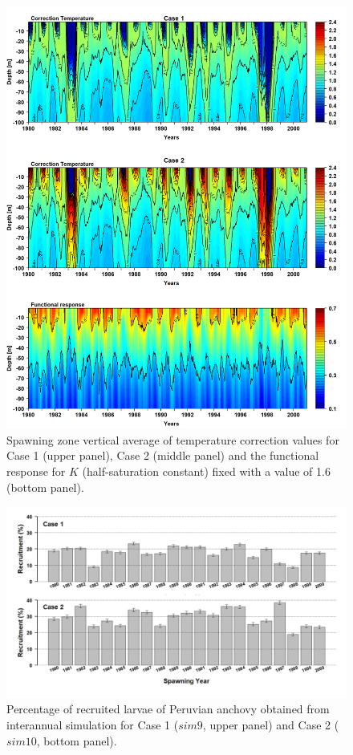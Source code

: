 \begin{figure}[H]
	\includegraphics[width=1.0\textwidth]{figures/Chap3CT_Depth_f_Inter.png}
	\centering
	\caption{Spawning zone vertical average of temperature correction values for Case 1 (upper panel), Case 2 (middle panel) and the functional response for $K$ (half-saturation constant) fixed with a value of 1.6 (bottom panel).}
	\label{Chap3CT_Depth_f_Inter}
\end{figure}

\begin{figure}[H]
	\includegraphics[width=1.0\textwidth]{figures/Chap3RecruitCase1Case2Inter.png}
	\centering
	\caption{Percentage of recruited larvae of Peruvian anchovy obtained from interannual simulation for Case 1 ($sim9$, upper panel) and Case 2 ($sim10$, bottom panel).}
	\label{Chap3RecruitCase1Case2Inter}
\end{figure}

